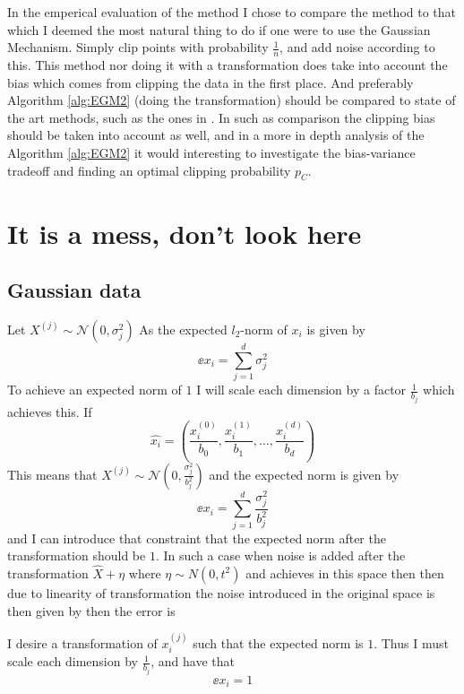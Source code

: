 \documentclass[a4paper,12pt]{article}
\begin{document}
In the emperical evaluation of the method I chose to compare the method
to that which I deemed the most natural thing to do if 
one were to use the Gaussian Mechanism. Simply clip points with 
probability $\frac{1}{n}$, and add noise according to this.
This method nor doing it with a transformation does take into account
the bias which comes from clipping the data in the first place.
And preferably Algorithm \ref{alg:EGM2} (doing the transformation) should
be compared to state of the art methods, such as the ones in \cite{coinpress, Huang2021}.
In such as comparison the clipping bias should be taken into account as well, and
in a more in depth analysis of the Algorithm \ref{alg:EGM2} it
would interesting to investigate the bias-variance tradeoff and finding an
optimal clipping probability $p_{C}$.



\newpage
\section{It is a mess, don't look here}
\subsection{Gaussian data}
Let $X^{(j)} \sim \mathcal{N}(0, \sigma_j^2)$ 
As the expected $l_2$-norm of $x_i$ is given by
\[
    \ee{x_i} = \sum_{j=1}^d \sigma_j^2
\]
To achieve an expected norm of $1$ I will scale 
each dimension by a factor $\frac{1}{b_j}$ which achieves this.
If 
\[
\hat{x_i} = \left( \frac{x_i^{(0)}}{b_0}, \frac{x_i^{(1)}}{b_1}, \dots, \frac{x_i^{(d)}}{b_d} \right)
\]
This means that $X^{(j)} \sim \mathcal{N}(0,\frac{\sigma_j^2}{b_j^2})$ 
and the expected norm is given by 
\[
    \ee{x_i} = \sum_{j=1}^d \frac{\sigma_j^2}{b_j^2}
\]
and I can introduce that constraint that the expected norm
after the transformation should be $1$.
In such a case when noise is added after the transformation
$\hat{X} + \eta$
where $\eta \sim N(0, t^2)$ and achieves \edp in this space
then then due to linearity of transformation the noise 
introduced in the original space is then given by
then the error is





I desire a transformation of $x_i^{(j)}$ such that the 
expected norm is $1$. Thus I must scale each dimension by
$\frac{1}{b_j}$, and have that 
\[
    \ee{x_i} = 1
\]
\end{document}
